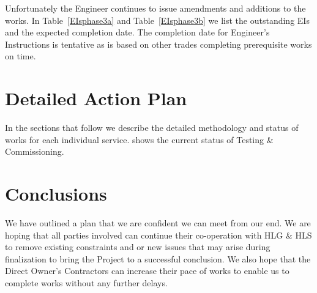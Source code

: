 Unfortunately the Engineer continues to issue amendments and additions to the works. In Table~\ref{EIsphase3a} and Table~\ref{EIsphase3b}  we list
the outstanding EIs and the expected completion date. The completion date for Engineer's Instructions is tentative as
is based on other trades completing prerequisite works on time.   
\bigskip



\section*{Detailed Action Plan}

In the sections that follow we describe the detailed methodology and status of works for each individual service.  shows the current status of Testing \& Commissioning.



\section*{Conclusions}

We have outlined a plan that we are confident we can meet from our end. We are hoping that all parties involved can continue their co-operation with HLG \& HLS to remove existing constraints and or new issues that may arise during finalization to bring the Project to a successful conclusion. We also hope that the Direct Owner's Contractors can increase their pace of works to enable us to complete works without any further delays.




